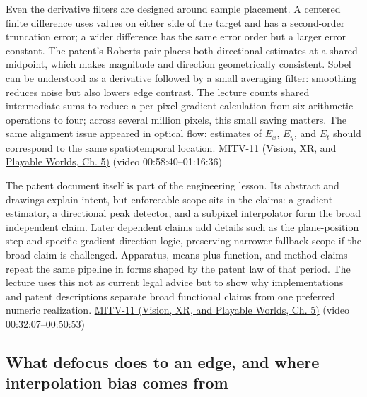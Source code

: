 Even the derivative filters are designed around sample placement. A centered finite difference uses values on either side of the target and has a second-order truncation error; a wider difference has the same error order but a larger error constant. The patent's Roberts pair places both directional estimates at a shared midpoint, which makes magnitude and direction geometrically consistent. Sobel can be understood as a derivative followed by a small averaging filter: smoothing reduces noise but also lowers edge contrast. The lecture counts shared intermediate sums to reduce a per-pixel gradient calculation from six arithmetic operations to four; across several million pixels, this small saving matters. The same alignment issue appeared in optical flow: estimates of \(E_x\), \(E_y\), and \(E_t\) should correspond to the same spatiotemporal location. \href{../07-Vision-XR-and-Playable-Worlds/main.pdf\#nameddest=04-visual-computing-ii-ch036-mitv-11---edge-detection-subpixel-position-cordic-line-detection-us-6408109}{MITV-11 (Vision, XR, and Playable Worlds, Ch. 5)} (video 00:58:40--01:16:36)

The patent document itself is part of the engineering lesson. Its abstract and drawings explain intent, but enforceable scope sits in the claims: a gradient estimator, a directional peak detector, and a subpixel interpolator form the broad independent claim. Later dependent claims add details such as the plane-position step and specific gradient-direction logic, preserving narrower fallback scope if the broad claim is challenged. Apparatus, means-plus-function, and method claims repeat the same pipeline in forms shaped by the patent law of that period. The lecture uses this not as current legal advice but to show why implementations and patent descriptions separate broad functional claims from one preferred numeric realization. \href{../07-Vision-XR-and-Playable-Worlds/main.pdf\#nameddest=04-visual-computing-ii-ch036-mitv-11---edge-detection-subpixel-position-cordic-line-detection-us-6408109}{MITV-11 (Vision, XR, and Playable Worlds, Ch. 5)} (video 00:32:07--00:50:53)

\subsection{What defocus does to an edge, and where interpolation bias comes from}\label{04-visual-computing-ii-ch030-what-defocus-does-to-an-edge-and-where-interpolation-bias-comes-from}

\hypertarget{04-visual-computing-ii-ch030-what-defocus-does-to-an-edge-and-where-interpolation-bias-comes-from}{}

